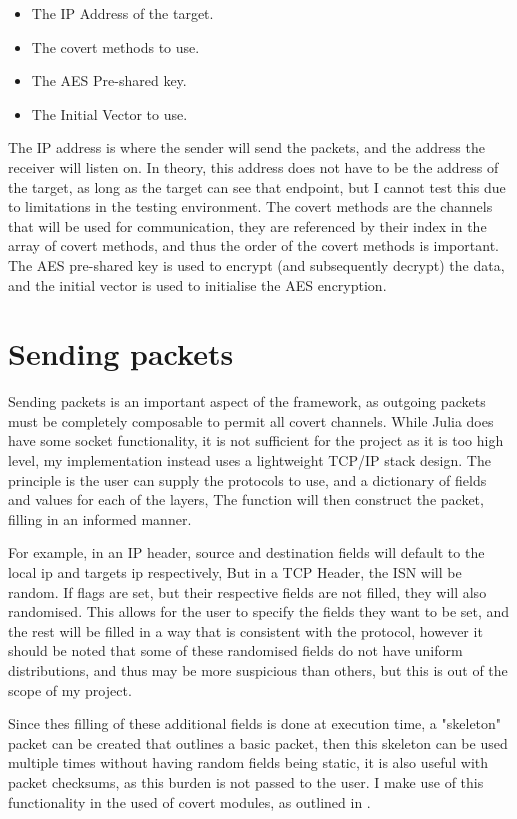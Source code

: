 \begin{itemize}
    \item The IP Address of the target.
    \item The covert methods to use.
    \item The AES Pre-shared key.
    \item The Initial Vector to use.
\end{itemize}

The IP address is where the sender will send the packets, and the address the receiver will listen on. In theory, this address does not have to be the address of the target, as long as the target can see that endpoint, but I cannot test this due to limitations in the testing environment. The covert methods are the channels that will be used for communication, they are referenced by their index in the array of covert methods, and thus the order of the covert methods is important.
The AES pre-shared key is used to encrypt (and subsequently decrypt) the data, and the initial vector is used to initialise the AES encryption.

\section{Sending packets}
\label{sec:sending_packets}

Sending packets is an important aspect of the framework, as outgoing packets must be completely composable to permit all covert channels. While Julia does have some socket functionality, it is not sufficient for the project as it is too high level, my implementation instead uses a lightweight TCP/IP stack design. The principle is the user can supply the protocols to use, and a dictionary of fields and values for each of the layers, The function will then construct the packet, filling in an informed manner.

For example, in an IP header, source and destination fields will default to the local ip and targets ip respectively, But in a TCP Header, the ISN will be random. If flags are set, but their respective fields are not filled, they will also randomised. This allows for the user to specify the fields they want to be set, and the rest will be filled in a way that is consistent with the protocol, however it should be noted that some of these randomised fields do not have uniform distributions, and thus may be more suspicious than others, but this is out of the scope of my project.
 
Since thes filling of these additional fields is done at execution time, a "skeleton" packet can be created that outlines a basic packet, then this skeleton can be used multiple times without having random fields being static, it is also useful with packet checksums, as this burden is not passed to the user. I make use of this functionality in the used of covert modules, as outlined in .

